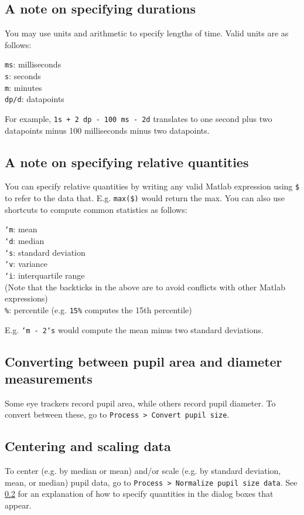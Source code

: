 \documentclass{article}
\begin{document}
\subsection{A note on specifying durations} \label{timestr_explanation}
You may use units and arithmetic to specify lengths of time. Valid units are as follows:
\begin{addmargin}[1em]{0em}
\texttt{ms}: milliseconds\\
\texttt{s}: seconds\\
\texttt{m}: minutes\\
\texttt{dp/d}: datapoints
\end{addmargin}
For example, \texttt{1s + 2 dp - 100 ms - 2d} translates to one second plus two datapoints minus 100 milliseconds minus two datapoints.
\subsection{A note on specifying relative quantities} \label{datastr_explanation}
You can specify relative quantities by writing any valid Matlab expression using \texttt{\$} to refer to the data that. E.g. \texttt{max(\$)} would return the max. You can also use shortcuts to compute common statistics as follows:
\begin{addmargin}[1em]{0em}
\texttt{`m}: mean\\
\texttt{`d}: median\\
\texttt{`s}: standard deviation\\
\texttt{`v}: variance\\
\texttt{`i}: interquartile range\\
(Note that the backticks in the above are to avoid conflicts with other Matlab expressions)\\
\texttt{\%}: percentile (e.g. \texttt{15\%} computes the 15th percentile)
\end{addmargin}
E.g. \texttt{`m - 2`s} would compute the mean minus two standard deviations.
\subsection{Converting between pupil area and diameter measurements}
Some eye trackers record pupil area, while others record pupil diameter. To convert between these, go to \texttt{Process > Convert pupil size}.
\subsection{Centering and scaling data}
To center (e.g. by median or mean) and/or scale (e.g. by standard deviation, mean, or median) pupil data, go to \texttt{Process > Normalize pupil size data}. See \ref{datastr_explanation} for an explanation of how to specify quantities in the dialog boxes that appear.
\end{document}

